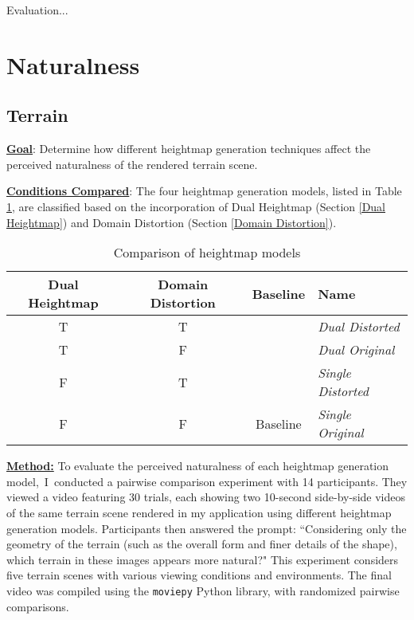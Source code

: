 \label{sec:4}

Evaluation...

\section{Naturalness}
\label{Naturalness}

\subsection{Terrain}

\textbf{\underline{Goal}}: Determine how different heightmap generation techniques affect the perceived naturalness of the rendered terrain scene.

\textbf{\underline{Conditions Compared}}: The four heightmap generation models, listed in Table \ref{tab:heightmap_models}, are classified based on the incorporation of Dual Heightmap (Section \ref{Dual Heightmap}) and Domain Distortion (Section \ref{Domain Distortion}).

\begin{table}[ht]
    \centering
    \begin{tabular}{|c|c|c|l|}
        \hline
        \textbf{Dual Heightmap} & \textbf{Domain Distortion} & \textbf{Baseline} & \textbf{Name} \\
        \hline
        T & T &  & \textit{Dual Distorted} \\
        T & F &  & \textit{Dual Original} \\
        F & T &  & \textit{Single Distorted} \\
        F & F & Baseline & \textit{Single Original} \\
        \hline
    \end{tabular}
    \caption{Comparison of heightmap models}
    \label{tab:heightmap_models}
\end{table}

\textbf{\underline{Method:}} To evaluate the perceived naturalness of each heightmap generation model, I conducted a pairwise comparison experiment with 14 participants. They viewed a video featuring 30 trials, each showing two 10-second side-by-side videos of the same terrain scene rendered in my application using different heightmap generation models. Participants then answered the prompt: ``Considering only the geometry of the terrain (such as the overall form and finer details of the shape), which terrain in these images appears more natural?" This experiment considers five terrain scenes with various viewing conditions and environments. The final video was compiled using the \texttt{moviepy} Python library, with randomized pairwise comparisons.

